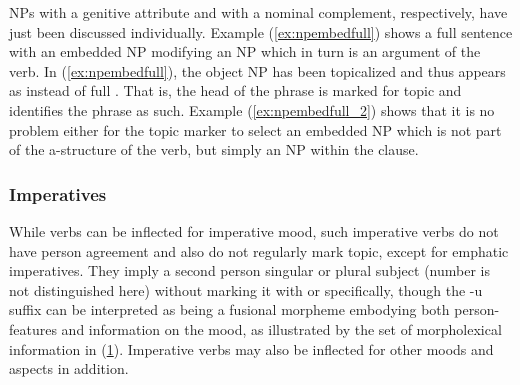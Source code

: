 NPs with a genitive attribute and with a nominal complement, respectively, have
just been discussed individually. Example (\ref{ex:npembedfull}) shows a full
sentence with an embedded NP modifying an NP which in turn is an argument of
the verb. In (\ref{ex:npembedfull}), the object NP has been topicalized and
thus appears as  instead of full .
That is, the head of the phrase is marked for topic and identifies the phrase
as such. Example (\ref{ex:npembedfull_2}) shows that it is no problem either
for the topic marker to select an embedded NP which is not part of the
a-structure of the verb, but simply an NP within the clause.


\subsubsection{Imperatives}

While verbs can be inflected for imperative mood, such imperative verbs do not
have person agreement and also do not regularly mark topic, except for emphatic
imperatives. They imply a second person singular or plural subject (number is
not distinguished here) without marking it with  or
 specifically, though the  {-u} suffix can be
interpreted as being a fusional morpheme embodying both person-features and
information on the mood, as illustrated by the set of morpholexical information
in (\ref{ex:impfeat}). Imperative verbs may also be inflected for other moods
and aspects in addition.

\begin{figure}[h]
\begin{morphlex}
\ex\label{ex:impfeat}%
\xe
\end{morphlex}
\end{figure}

